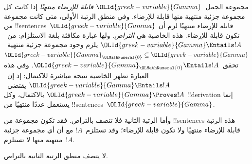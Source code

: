 \documentclass[../../../include/open-logic-section]{subfiles}
\begin{document}


\begin{explain}
مجموعة الجمل~$\OLId{greek-variable}{Gamma}$ \emph{قابلة للإرضاء منتهيًا} إذا كانت
كل مجموعة جزئية منتهية منها قابلة للإرضاء.
وفي منطق الرتبة الأولى، متى كانت مجموعة من !!{sentence}s~$\OLId{greek-variable}{Gamma}$
قابلة للإرضاء منتهيًا لزم أن تكون قابلة للإرضاء.
هذه الخاصية هي \emph{التراص}. ولها عبارة مكافئة بلغة الاستلزام:
من~$\OLId{greek-variable}{Gamma} \Entails !A$ يلزم وجود مجموعة جزئية
منتهية~$\OLId{greek-variable}{Gamma}_\OLMathNumeral{0} \subseteq \OLId{greek-variable}{Gamma}$ تحقق~$\OLId{greek-variable}{Gamma}_\OLMathNumeral{0} \Entails !A$.
وفي هذه العبارة تظهر الخاصية نتيجة مباشرة للاكتمال:
إذ إن~$\OLId{greek-variable}{Gamma} \Entails !A$ يقتضي~$\OLId{greek-variable}{Gamma} \Proves !A$ بالاكتمال،
وكل !!{derivation} إنما يستعمل عددًا منتهيًا من
!!{sentence}s~$\OLId{greek-variable}{Gamma}$.

وأما الرتبة الثانية فلا تتصف بالتراص. فقد تكون مجموعة من
!!{sentence}s هذه الرتبة قابلة للإرضاء منتهيًا ولا تكون قابلة
للإرضاء؛ وقد تستلزم~$!A$ مع أن أي مجموعة جزئية منتهية منها
لا تستلزم~$!A$.
\end{explain}

\begin{thm}
لا يتصف منطق الرتبة الثانية بالتراص.
\end{thm}
\end{document}
